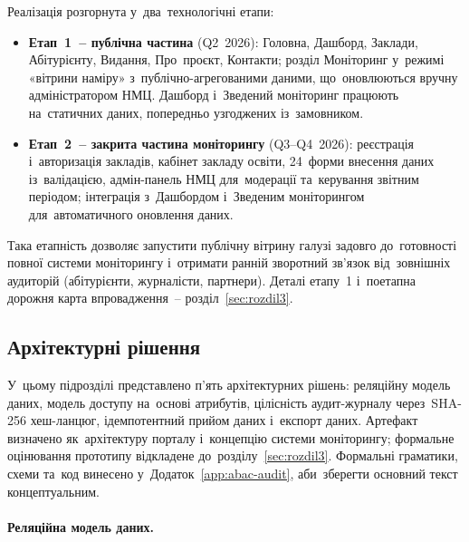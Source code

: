 Реалізація розгорнута у~два~технологічні етапи:
\begin{itemize}
    \item \textbf{Етап~1~-- публічна частина} (Q2~2026): Головна, Дашборд, Заклади, Абітурієнту, Видання, Про~проєкт, Контакти; розділ Моніторинг у~режимі «вітрини наміру» з~публічно-агрегованими даними, що~оновлюються вручну адміністратором НМЦ. Дашборд і~Зведений моніторинг працюють на~статичних даних, попередньо узгоджених із~замовником.
    \item \textbf{Етап~2~-- закрита частина моніторингу} (Q3--Q4~2026): реєстрація і~авторизація закладів, кабінет закладу освіти, 24~форми внесення даних із~валідацією, адмін-панель НМЦ для~модерації та~керування звітним періодом; інтеграція з~Дашбордом і~Зведеним моніторингом для~автоматичного оновлення даних.
\end{itemize}
Така етапність дозволяє запустити публічну вітрину галузі задовго до~готовності повної системи моніторингу і~отримати ранній зворотний зв'язок від~зовнішніх аудиторій (абітурієнти, журналісти, партнери). Деталі етапу~1 і~поетапна дорожня карта впровадження~-- розділ~\ref{sec:rozdil3}.

\subsection{Архітектурні рішення}
\label{sec:p2-architecture}

У~цьому підрозділі представлено п'ять архітектурних рішень: реляційну модель даних, модель доступу на~основі атрибутів, цілісність аудит-журналу через~SHA-256 хеш-ланцюг, ідемпотентний прийом даних і~експорт даних. Артефакт визначено як~архітектуру порталу і~концепцію системи моніторингу; формальне оцінювання прототипу відкладене до~розділу~\ref{sec:rozdil3}. Формальні граматики, схеми та~код винесено у~Додаток~\ref{app:abac-audit}, аби~зберегти основний текст концептуальним.

\paragraph*{\textbf{Реляційна модель даних.}}
\label{sec:p2-arch-data}

